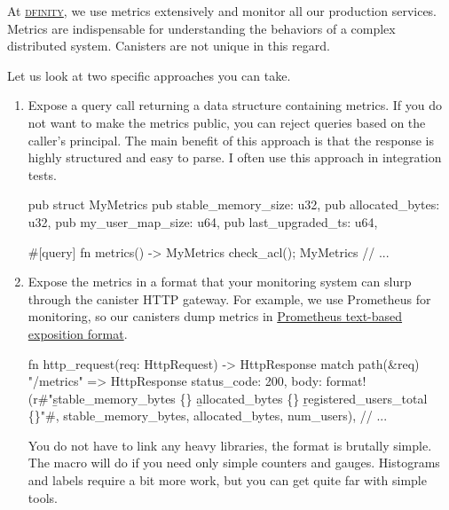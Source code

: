 \documentclass{article}
\begin{document}
At \href{https://dfinity.org/}{\textsc{dfinity}}, we use metrics extensively and monitor all our production services.
Metrics are indispensable for understanding the behaviors of a complex distributed system.
Canisters are not unique in this regard.


Let us look at two specific approaches you can take.

\begin{enumerate}
\item
  Expose a query call returning a data structure containing metrics.
  If you do not want to make the metrics public, you can reject queries based on the caller's principal.
  The main benefit of this approach is that the response is highly structured and easy to parse.
  I often use this approach in integration tests.

\begin{code}[good]
pub struct MyMetrics {
  pub stable_memory_size: u32,
  pub allocated_bytes: u32,
  pub my_user_map_size: u64,
  pub last_upgraded_ts: u64,
}

#[query]
fn metrics() -> MyMetrics {
  check_acl();
  MyMetrics {
    // ...
  }
}
\end{code}
\item

  Expose the metrics in a format that your monitoring system can slurp through the canister HTTP gateway.
  For example, we use Prometheus for monitoring, so our canisters dump metrics in \href{https://prometheus.io/docs/instrumenting/exposition_formats/#text-based-format}{Prometheus text-based exposition format}.

\begin{code}[good]
fn http_request(req: HttpRequest) -> HttpResponse {
  match path(&req) {
    "/metrics" => HttpResponse {
        status_code: 200,
        body: format!(r#"\b{stable_memory_bytes \{\}}
                         \b{allocated_bytes \{\}}
                         \b{registered_users_total \{\}}"#,
                      stable_memory_bytes, allocated_bytes, num_users),
        // ...
    }
  }
}
\end{code}

  You do not have to link any heavy libraries, the format is brutally simple.
  The  macro will do if you need only simple counters and gauges.
  Histograms and labels require a bit more work, but you can get quite far with simple tools.
\end{enumerate}
\end{document}
